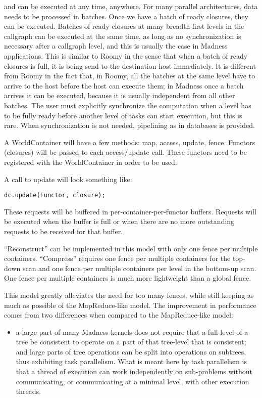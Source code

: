 \documentclass{article}
\begin{document}
\begin{enumerate}
and can be executed at any time, anywhere. For many parallel architectures, data
needs to be processed in batches. Once we have a batch of ready closures, they can
be executed. Batches of ready closures at many breadth-first levels in the callgraph
can be executed at the same time, as long as no synchronization is necessary after
a callgraph level, and this is usually the case in Madness applications.
This is similar to Roomy in the sense that when a batch of ready closures is full,
it is being send to the destination host immediately. It is different from Roomy
in the fact that, in Roomy, all the batches at the same level have to arrive
to the host before the host can execute them; in Madness once a batch arrives
it can be executed, because it is usually independent from all other batches.
The user must explicitly synchronize the computation when a level has to be
fully ready before another level of tasks can start execution, but this
is rare. When synchronization is not needed, pipelining as in databases is provided.


A WorldContainer will have a few methods: map, access, update, fence.  Functors
(closures) will be passed to each access/update call. These functors need to be
registered with the WorldContainer in order to be used.

A call to update will look something like:

{\tt dc.update(Functor, closure);}

 These requests will be buffered in per-container-per-functor buffers.
Requests will be executed when the buffer is full or when there are no more
outstanding requests to be received for that buffer.

``Reconstruct'' can be implemented in this model with only one fence per
multiple containers. ``Compress'' requires one fence per multiple containers for
the top-down scan and one fence per multiple containers per level in the
bottom-up scan. One fence per multiple containers is much more lightweight than
a global fence.

This model greatly alleviates the need for too many fences, while
still keeping as much as possible of the MapReduce-like model. The improvement
in performance comes from two differences when compared to the MapReduce-like
model: 
  \begin{itemize}
      \item a large part of many Madness kernels does not require that a full
level of a tree be consistent to operate on a part of that tree-level that is
consistent; and large parts of tree operations can be split into operations on
subtrees, thus exhibiting task parallelism. What is meant here
by task parallelism is that a thread of execution can work independently on
sub-problems without communicating, or communicating at a minimal level,
with other execution threads. 
       

\end{itemize}
\end{enumerate}
\end{document}
